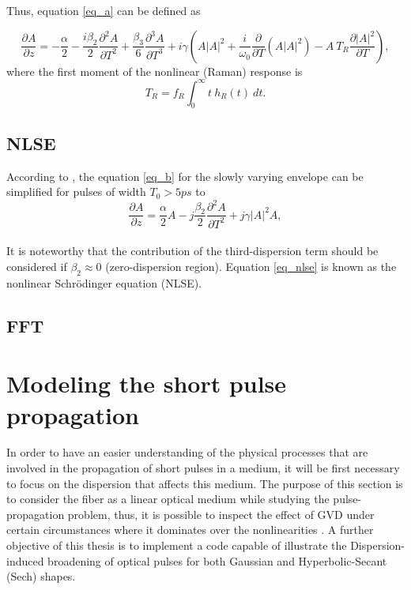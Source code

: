     Thus, equation \eqref{eq_a} can be defined as 
    
    \begin{equation}\label{eq_b}
        \frac{\partial A}{\partial z}=-\frac{\alpha}{2} - \frac{i \beta_2}{2} \frac{\partial^2 A}{\partial T^2} +\frac{\beta_3}{6} \frac{\partial^3 A}{\partial T^3} +i \gamma   \left(A\left|A\right|^2+ \frac{i}{\omega_0} \frac{\partial}{\partial T} (A\left|A \right|^2)- A \ T_R \frac{\partial \left|A \right|^2}{\partial T} \right),
        \end{equation}
    where the first moment of the nonlinear (Raman) response is
    \begin{equation}\label{eq_TR}
        T_R = f_R\int_{0}^{\infty} t \ h_R(t) \ dt.
    \end{equation}

        
    \subsection{NLSE}
        According to \citep{AgrawalBook}, the equation  \eqref{eq_b} for the slowly varying envelope can be simplified for pulses of width $T_0 > 5 ps$ to
        \begin{equation}
                \frac{\partial A}{\partial z} = \frac{\alpha}{2}A-j \frac{\beta_2}{2}\frac{\partial^2A}{\partial T^2}+j\gamma|A|^2 A,
                \label{eq_nlse}
            \end{equation}
            \ \\
       It is noteworthy that the contribution of the third-dispersion term should be considered if $\beta_2 \approx 0$ (zero-dispersion region). Equation \eqref{eq_nlse} is known as the nonlinear Schrödinger equation (NLSE).


    \subsection{FFT}
    
    \section{Modeling the short  pulse propagation}
    In order to have an easier understanding of the physical processes that are involved in the propagation of short pulses in a medium, it will be first necessary to focus on the dispersion that affects this medium. The purpose of this section is to consider the fiber as a linear optical medium while studying the pulse-propagation problem, thus, it is possible to inspect the effect of GVD under certain circumstances where it dominates over the nonlinearities \citep{ AgrawalBook}. A further objective of this thesis is to implement a code capable of illustrate the Dispersion-induced broadening of optical pulses for both Gaussian and Hyperbolic-Secant (Sech) shapes.

